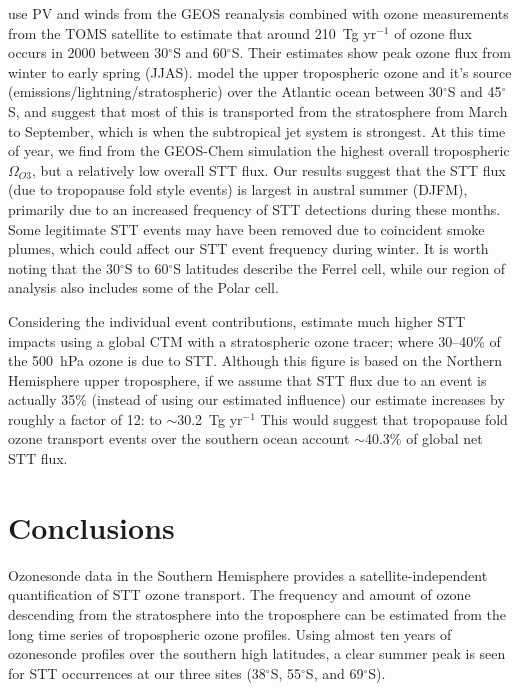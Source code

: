 \documentclass{article}
\begin{document}
  \citet{Olsen2003} use PV and winds from the GEOS reanalysis combined with ozone measurements from the TOMS satellite to estimate that around 210~Tg yr$^{-1}$ of ozone flux occurs in 2000 between 30$^{\circ}$S and 60$^{\circ}$S.
  Their estimates show peak ozone flux from winter to early spring (JJAS).
  \citet{Liu2016} model the upper tropospheric ozone and it's source (emissions/lightning/stratospheric) over the Atlantic ocean between 30$^{\circ}$S and 45$^{\circ}$S, and suggest that most of this is transported from the stratosphere from March to September, which is when the subtropical jet system is strongest.
  At this time of year, we find from the GEOS-Chem simulation the highest overall tropospheric $\Omega_{O3}$, but a relatively low overall STT flux.
  Our results suggest that the STT flux (due to tropopause fold style events) is largest in austral summer (DJFM), primarily due to an increased frequency of STT detections during these months.
  Some legitimate STT events may have been removed due to coincident smoke plumes, which could affect our STT event frequency during winter.
  It is worth noting that the 30$^{\circ}$S to 60$^{\circ}$S latitudes describe the Ferrel cell, while our region of analysis also includes some of the Polar cell.
  
  Considering the individual event contributions, \citet{Terao2008} estimate much higher STT impacts using a global CTM with a stratospheric ozone tracer; where 30--40\% of the 500~hPa ozone is due to STT.
  Although this figure is based on the Northern Hemisphere upper troposphere, if we assume that STT flux due to an event is actually 35\% (instead of using our estimated influence) our estimate increases by roughly a factor of 12: to $\sim$30.2~Tg yr$^{-1}$
  This would suggest that tropopause fold ozone transport events over the southern ocean account $\sim$40.3\% of global net STT flux.
  
  
\section{Conclusions}
  
  Ozonesonde data in the Southern Hemisphere provides a satellite-independent quantification of STT ozone transport.
  The frequency and amount of ozone descending from the stratosphere into the troposphere can be estimated from the long time series of tropospheric ozone profiles.
  Using almost ten years of ozonesonde profiles over the southern high latitudes, a clear summer peak is seen for STT occurrences at our three sites (38$^{\circ}$S, 55$^{\circ}$S, and 69$^{\circ}$S).
  
\end{document}
